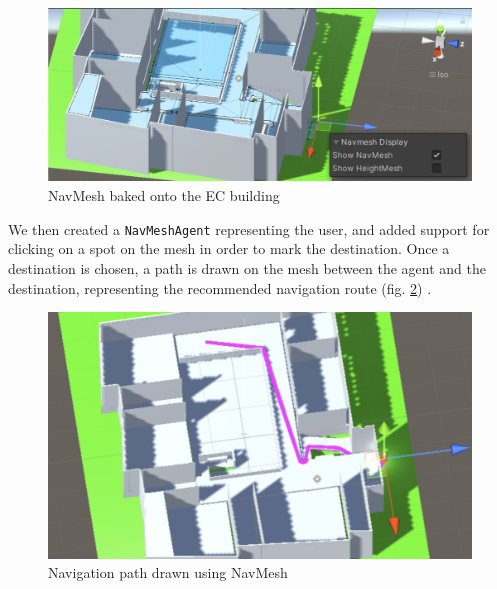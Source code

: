         \begin{figure}[ht]
            \centering
            \includegraphics[width=\textwidth]{figures/demos/indoor_navmesh_display.png}
            \caption{NavMesh baked onto the EC building}
            \label{3:fig:indoor_navmesh_display}
        \end{figure}
        
        We then created a \texttt{NavMeshAgent} representing the user, and added support for clicking on a spot on the mesh in order to mark the destination. Once a destination is chosen, a path is drawn on the mesh between the agent and the destination, representing the recommended navigation route (fig. \ref{3:fig:indoor_navmesh_path}) .
        
        \begin{figure}[ht]
            \centering
            \includegraphics[width=\textwidth]{figures/demos/indoor_navmesh_path.png}
            \caption{Navigation path drawn using NavMesh}
            \label{3:fig:indoor_navmesh_path}
        \end{figure}
        
